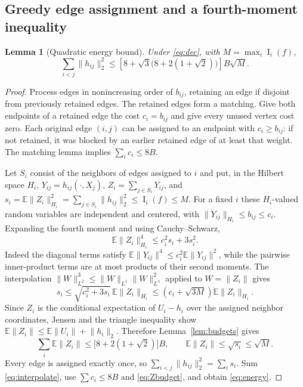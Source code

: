 \documentclass[11pt,letterpaper]{article}
\newtheorem{lemma}[theorem]{Lemma}
\theoremstyle{definition}\newtheorem{definition}[theorem]{Definition}
\newcommand{\E}{\mathbb E}
\newcommand{\Inf}{\operatorname{I}}
\newcommand{\norm}[1]{\lVert #1\rVert}
\begin{document}
\subsection{Greedy edge assignment and a fourth-moment inequality}
\begin{lemma}[Quadratic energy bound]\label{lem:energy}
Under \eqref{eq:dec}, with $M=\max_i\Inf_i(f)$,
\begin{equation}\label{eq:energy}
\sum_{i<j}\norm{h_{ij}}_2^2\le
\left[8+\sqrt3\bigl(8+2(1+\sqrt2)\bigr)\right]B\sqrt M.
\end{equation}
\end{lemma}
\begin{proof}
Process edges in nonincreasing order of $b_{ij}$, retaining an edge if disjoint from previously retained edges. The retained edges form a matching. Give both endpoints of a retained edge the cost $c_i=b_{ij}$ and give every unused vertex cost zero. Each original edge $(i,j)$ can be assigned to an endpoint with $c_i\ge b_{ij}$: if not retained, it was blocked by an earlier retained edge of at least that weight. The matching lemma implies $\sum_i c_i\le8B$.

Let $S_i$ consist of the neighbors of edges assigned to $i$ and put, in the Hilbert space $H_i$,
$Y_{ij}=h_{ij}(\cdot,X_j)$, $Z_i=\sum_{j\in S_i}Y_{ij}$, and
$s_i=\E\norm{Z_i}_{H_i}^2=\sum_{j\in S_i}\norm{h_{ij}}_2^2\le\Inf_i(f)\le M$.
For a fixed $i$ these $H_i$-valued random variables are independent and centered, with $\norm{Y_{ij}}_{H_i}\le b_{ij}\le c_i$. Expanding the fourth moment and using Cauchy--Schwarz,
\begin{equation}\label{eq:4moment}
\E\norm{Z_i}_{H_i}^4\le c_i^2s_i+3s_i^2.
\end{equation}
Indeed the diagonal terms satisfy $\E\norm{Y_{ij}}^4\le c_i^2\E\norm{Y_{ij}}^2$, while the pairwise inner-product terms are at most products of their second moments. The interpolation $\norm W_{L^2}^3\le\norm W_{L^1}\norm W_{L^4}^2$ applied to $W=\norm{Z_i}$ gives
\begin{equation}\label{eq:interpolate}
s_i\le\sqrt{c_i^2+3s_i}\,\E\norm{Z_i}_{H_i}
\le(c_i+\sqrt{3M})\E\norm{Z_i}_{H_i}.
\end{equation}
Since $Z_i$ is the conditional expectation of $U_i-h_i$ over the assigned neighbor coordinates, Jensen and the triangle inequality show
$\E\norm{Z_i}\le\E\norm{U_i}+\norm{h_i}_2$.
Therefore Lemma~\ref{lem:budgets} gives
\begin{equation}\label{eq:Zbudget}
\sum_i\E\norm{Z_i}\le\bigl[8+2(1+\sqrt2)\bigr]B,
\qquad \E\norm{Z_i}\le\sqrt{s_i}\le\sqrt M.
\end{equation}
Every edge is assigned exactly once, so $\sum_{i<j}\norm{h_{ij}}_2^2=\sum_i s_i$. Sum \eqref{eq:interpolate}, use $\sum c_i\le8B$ and \eqref{eq:Zbudget}, and obtain \eqref{eq:energy}.
\end{proof}
\end{document}
